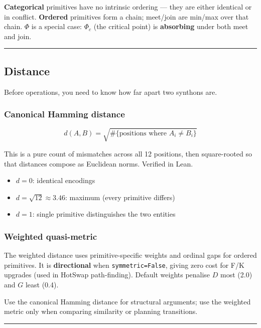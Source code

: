 \documentclass[12pt,a4paper]{article}
\begin{document}
\textbf{Categorical} primitives have no intrinsic ordering --- they are either identical or in conflict.
\textbf{Ordered} primitives form a chain; meet/join are min/max over that chain.
\textbf{$\Phi$} is a special case: $\Phi_c$ (the critical point) is \textbf{absorbing} under both meet and join.

\begin{center}
\rule{0.5\textwidth}{0.4pt}
\end{center}

\subsection{Distance}

Before operations, you need to know how far apart two synthons are.

\subsubsection{Canonical Hamming distance}

\[d(A, B) = \sqrt{\#\{\text{positions where } A_i \neq B_i\}}\]

This is a pure count of mismatches across all 12 positions, then square-rooted so that distances compose as Euclidean norms. Verified in Lean.

\begin{itemize}
    \item $d = 0$: identical encodings
    \item $d = \sqrt{12} \approx 3.46$: maximum (every primitive differs)
    \item $d = 1$: single primitive distinguishes the two entities
\end{itemize}

\subsubsection{Weighted quasi-metric}

The weighted distance uses primitive-specific weights and ordinal gaps for ordered primitives. It is \textbf{directional} when \texttt{symmetric=False}, giving zero cost for F/K upgrades (used in HotSwap path-finding). Default weights penalise $D$ most (2.0) and $G$ least (0.4).

Use the canonical Hamming distance for structural arguments; use the weighted metric only when comparing similarity or planning transitions.

\begin{center}
\rule{0.5\textwidth}{0.4pt}
\end{center}
\end{document}
